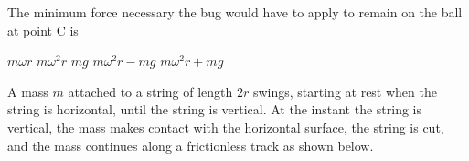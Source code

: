 \documentclass{../../oss-classkick-exam}
\begin{document}
\begin{multicols*}{2}
\begin{questions}
    \question The minimum force necessary the bug would have to apply to remain
    on the ball at point C is
    \begin{choices}
      \choice $m\omega r$
      \choice $m\omega^2r$
      \choice $mg$
      \choice $m\omega^2r-mg$
      \choice $m\omega^2r+mg$
    \end{choices}
    \label{bug2}


    
  \end{questions}
\end{multicols*}
\newpage


\genfreedirections

\begin{questions}
  \question A mass $m$ attached to a string of length $2r$ swings, starting at
  rest when the string is horizontal, until the string is vertical. At the
  instant the string is vertical, the mass makes contact with the horizontal
  surface, the string is cut, and the mass continues along a frictionless track
  as shown below.
  \begin{center}
    \vspace{-.1in}
  \end{center}
\end{questions}
\end{document}
